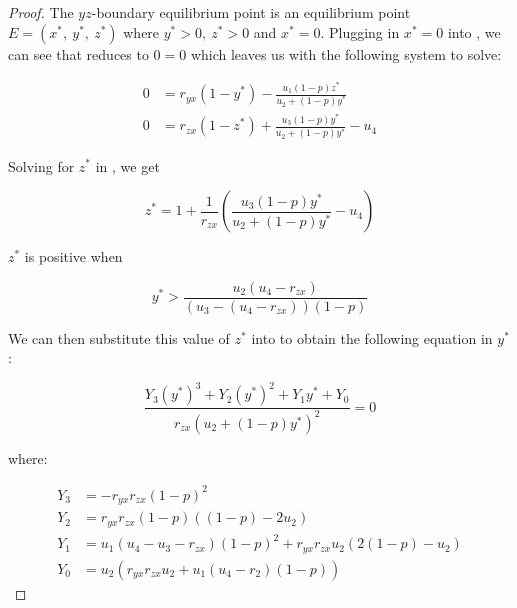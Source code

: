 \begin{proof}
    The $yz$-boundary equilibrium point is an equilibrium point $E=\left(x^*,\ y^*,\ z^*\right)$ where $y^*>0,\ z^*>0$ and $x^*=0$. Plugging in $x^*=0$ into , we can see that  reduces to $0=0$ which leaves us with the following system to solve:

    \begin{subequations}\label{system:yz-boundary}
        \begin{align}
            0 &= r_{yx}\left(1-y^*\right)-\frac{u_1\left(1-p\right)z^*}{u_2+\left(1-p\right)y^*} \label{eq:yz-boundary-y}\\
            0 &= r_{zx}\left(1-z^*\right)+\frac{u_3\left(1-p\right)y^*}{u_2+\left(1-p\right)y^*}-u_4 \label{eq:yz-boundary-z}
        \end{align}
    \end{subequations}

    Solving for $z^*$ in , we get
    
    \begin{equation*}
        z^*=1+\frac{1}{r_{zx}}\left(\frac{u_3\left(1-p\right)y^*}{u_2+\left(1-p\right)y^*}-u_4\right)
    \end{equation*}
    
    $z^*$ is positive when

    \begin{equation*}
        y^*>\frac{u_2\left(u_4-r_{zx}\right)}{\left(u_3-\left(u_4-r_{zx}\right)\right)\left(1-p\right)}
    \end{equation*}

    We can then substitute this value of $z^*$ into  to obtain the following equation in $y^*$:

    \begin{equation}\label{eq:yz-Y-vars}
        \frac{Y_3\left(y^*\right)^3+Y_2\left(y^*\right)^2+Y_1y^*+Y_0}{r_{zx}\left(u_2+\left(1-p\right)y^*\right)^2}=0
    \end{equation}

    where:

    \begin{align*}
        Y_3 &= -r_{yx}r_{zx}\left(1-p\right)^2\\
        Y_2 &= r_{yx}r_{zx}\left(1-p\right)\left(\left(1-p\right)-2u_2\right)\\
        Y_1 &= u_1\left(u_4-u_3-r_{zx}\right)\left(1-p\right)^2+r_{yx}r_{zx}u_2\left(2\left(1-p\right)-u_2\right)\\
        Y_0 &= u_2\left(r_{yx}r_{zx}u_2+u_1\left(u_4-r_2\right)\left(1-p\right)\right)
    \end{align*}


\end{proof}
